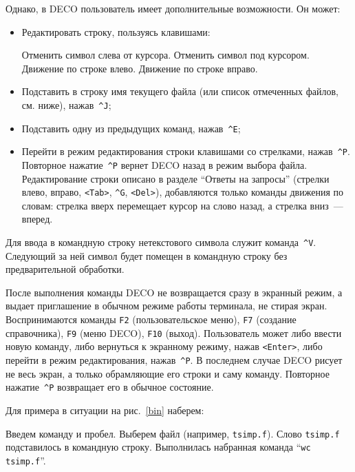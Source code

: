 Однако, в DECO пользователь имеет дополнительные возможности. Он может:

\begin{itemize}
\item
Редактировать строку, пользуясь клавишами:

\begin{example}
Отменить символ слева от курсора.
Отменить символ под курсором.
Движение по строке влево.
Движение по строке вправо.
\end{example}

\item
Подставить в строку имя текущего файла (или список отмеченных
файлов, см. ниже), нажав~{\tt \^{}J};
\item
Подставить одну из предыдущих команд, нажав~{\tt \^{}E};
\item
Перейти в режим редактирования строки клавишами со стрелками,
нажав~{\tt \^{}P}. Повторное нажатие~{\tt \^{}P} вернет DECO назад в
режим выбора файла. Редактирование строки описано в разделе ``Ответы
на запросы'' (стрелки влево, вправо, {\tt <Tab>}, {\tt \^{}G}, {\tt <Del>}),
добавляются только команды движения по словам: стрелка
вверх перемещает курсор на слово назад, а стрелка вниз~--- вперед.
\end{itemize}

Для ввода в командную строку нетекстового символа
служит команда~{\tt \^{}V}. Следующий за ней символ будет помещен
в командную строку без предварительной обработки.

После выполнения команды DECO не возвращается сразу в экранный режим,
а выдает приглашение в обычном режиме работы терминала, не стирая
экран. Воспринимаются команды {\tt F2} (пользовательское меню),
{\tt F7} (создание справочника), {\tt F9} (меню DECO), {\tt F10} (выход).
Пользователь может либо ввести новую команду, либо вернуться к
экранному режиму, нажав {\tt <Enter>}, либо перейти в режим
редактирования, нажав~{\tt \^{}P}.
В последнем случае DECO рисует не весь экран, а только обрамляющие
его строки и саму команду. Повторное нажатие~{\tt \^{}P} возвращает
его в обычное состояние.

Для примера в ситуации на рис.~\ref{bin} наберем:

\begin{example}
Введем команду и пробел.
\litem{$\uparrow$ $\downarrow$ $\leftarrow$ $\rightarrow$}
Выберем файл (например, {\tt tsimp.f}).
Слово {\tt tsimp.f} подставилось в командную строку.
Выполнилась набранная команда ``{\tt wc tsimp.f}''.
\end{example}

